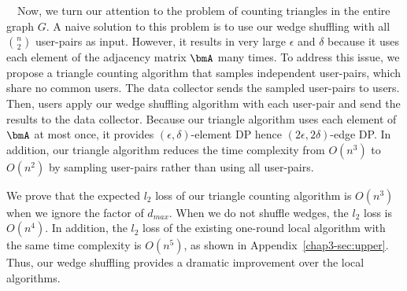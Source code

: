 \smallskip
{}~~Now, we turn our attention to the problem of counting triangles in the entire graph $G$. 
A naive solution to this problem is to use our wedge shuffling with all $\binom{n}{2}$ user-pairs as input. 
However, it results in very large $\epsilon$ and $\delta$ because it uses each element of the adjacency matrix $\bmA$ many times. 
To address this issue, 
we propose a triangle counting algorithm that samples 
independent user-pairs, which share no common users. 
The data collector sends the sampled user-pairs to users. 
Then, users apply our wedge shuffling algorithm with each user-pair 
and send the results to the data collector. 
Because our triangle algorithm uses each element of 
$\bmA$ at most once, it provides $(\epsilon,\delta)$-element DP hence $(2\epsilon,2\delta)$-edge DP. 
In addition, our triangle algorithm reduces the time complexity from $O(n^3)$ to $O(n^2)$ by sampling user-pairs rather than using all user-pairs. 

We prove that the expected $l_2$ loss of our triangle counting algorithm is 
$O(n^3)$ when we ignore the factor of $d_{max}$. 
When we do not shuffle wedges, the 
$l_2$ loss is 
$O(n^4)$. 
In addition, the $l_2$ loss of the existing one-round local algorithm \cite{Imola_USENIX22} with the same time complexity is $O(n^5)$, as shown in 
Appendix~\ref{chap3-sec:upper}. 
Thus, our wedge shuffling provides a dramatic improvement over the local algorithms. 

